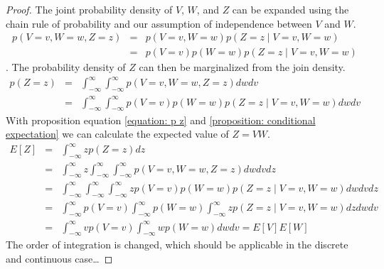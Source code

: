 \documentclass[11pt]{article}
\newcommand{\propref}[1]{\ref{proposition: #1}}
\newcommand{\eqnref}[1]{\ref{equation: #1}}
\begin{document}
\begin{proof}
    The joint probability density of $V$, $W$, and $Z$ can be expanded using the chain rule of probability and our assumption of independence between $V$ and $W$.
    \begin{eqnarray}
        p(V=v, W=w, Z=z) &=& p(V=v, W=w)p(Z=z \mid V=v,W=w) \nonumber \\
            &=& p(V=v)p(W=w)p(Z=z \mid V=v,W=w)
            \label{equation: joint density}
    \end{eqnarray}.
    The probability density of $Z$ can then be marginalized from the join density.
    \begin{eqnarray}
        p(Z=z) &=& \int_{-\infty}^{\infty} \int_{-\infty}^{\infty} p(V=v, W=w, Z=z) dwdv \nonumber \\
        &=& \int_{-\infty}^{\infty} \int_{-\infty}^{\infty} p(V=v)p(W=w)p(Z=z \mid V=v,W=w) dwdv
        \label{equation: p z}
    \end{eqnarray}
    With proposition equation \eqnref{p z} and \propref{conditional expectation} we can calculate the expected value of $Z=VW$.
    \begin{eqnarray}
        E[Z] &=& \int_{-\infty}^{\infty} zp(Z=z)dz \nonumber \\
        &=& \int_{-\infty}^{\infty} z \int_{-\infty}^{\infty} \int_{-\infty}^{\infty} p(V=v,W=w,Z=z) dwdvdz \nonumber \\
        &=& \int_{-\infty}^{\infty} \int_{-\infty}^{\infty} \int_{-\infty}^{\infty} zp(V=v)p(W=w)p(Z=z \mid V=v,W=w) dwdvdz \nonumber \\
        &=& \int_{-\infty}^{\infty} p(V=v) \int_{-\infty}^{\infty} p(W=w) \int_{-\infty}^{\infty} zp(Z=z \mid V=v,W=w) dzdwdv \nonumber \\
        &=& \int_{-\infty}^{\infty} vp(V=v) \int_{-\infty}^{\infty} wp(W=w) dw dv = E[V]E[W]
        \label{equation: z_mean}
    \end{eqnarray}
    The order of integration is changed, which should be applicable in the discrete and continuous case\dots
\end{proof}

%
%

\end{document}
